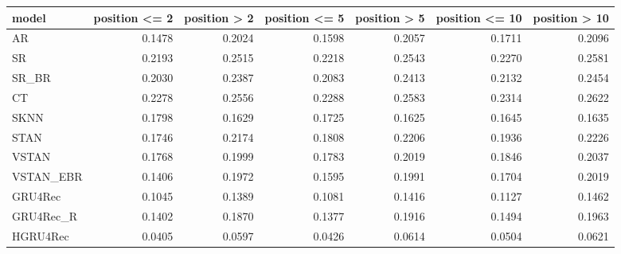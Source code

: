 \begin{tabular}{lrrrrrr}
\toprule
     model &  position <= 2 &  position > 2 &  position <= 5 &  position > 5 &  position <= 10 &  position > 10 \\
\midrule
        AR &         0.1478 &        0.2024 &         0.1598 &        0.2057 &          0.1711 &         0.2096 \\
        SR &         0.2193 &        0.2515 &         0.2218 &        0.2543 &          0.2270 &         0.2581 \\
     SR\_BR &         0.2030 &        0.2387 &         0.2083 &        0.2413 &          0.2132 &         0.2454 \\
        CT &         0.2278 &        0.2556 &         0.2288 &        0.2583 &          0.2314 &         0.2622 \\
      SKNN &         0.1798 &        0.1629 &         0.1725 &        0.1625 &          0.1645 &         0.1635 \\
      STAN &         0.1746 &        0.2174 &         0.1808 &        0.2206 &          0.1936 &         0.2226 \\
     VSTAN &         0.1768 &        0.1999 &         0.1783 &        0.2019 &          0.1846 &         0.2037 \\
 VSTAN\_EBR &         0.1406 &        0.1972 &         0.1595 &        0.1991 &          0.1704 &         0.2019 \\
   GRU4Rec &         0.1045 &        0.1389 &         0.1081 &        0.1416 &          0.1127 &         0.1462 \\
 GRU4Rec\_R &         0.1402 &        0.1870 &         0.1377 &        0.1916 &          0.1494 &         0.1963 \\
  HGRU4Rec &         0.0405 &        0.0597 &         0.0426 &        0.0614 &          0.0504 &         0.0621 \\
\bottomrule
\end{tabular}
